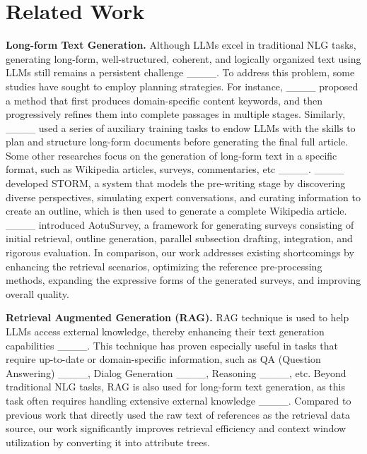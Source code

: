 \section{Related Work}
\textbf{Long-form Text Generation.}
Although LLMs excel in traditional NLG tasks, generating long-form, well-structured, coherent, and logically organized text using LLMs still remains a persistent challenge ____. To address this problem, some studies have sought to employ planning strategies. For instance, ____ proposed a method that first produces domain-specific content keywords, and then progressively refines them into complete passages in multiple stages. Similarly, ____ used a series of auxiliary training tasks to endow LLMs with the skills to plan and structure long-form documents before generating the final full article. Some other researches focus on the generation of long-form text in a specific format, such as Wikipedia articles, surveys, commentaries, etc ____. ____ developed STORM, a system that models the pre-writing stage by discovering diverse perspectives, simulating expert conversations, and curating information to create an outline, which is then used to generate a complete Wikipedia article. ____ introduced AotuSurvey, a framework for generating surveys consisting of initial retrieval, outline generation, parallel subsection drafting, integration, and rigorous evaluation. In comparison, our work addresses existing shortcomings by enhancing the retrieval scenarios, optimizing the reference pre-processing methods, expanding the expressive forms of the generated surveys, and improving overall quality.

\textbf{Retrieval Augmented Generation (RAG).}
RAG technique is used to help LLMs access external knowledge, thereby enhancing their text generation capabilities ____. This technique has proven especially useful in tasks that require up-to-date or domain-specific information, such as QA (Question Answering) ____, Dialog Generation ____, Reasoning ____, etc. Beyond traditional NLG tasks, RAG is also used for long-form text generation, as this task often requires handling extensive external knowledge ____. Compared to previous work that directly used the raw text of references as the retrieval data source, our work significantly improves retrieval efficiency and context window utilization by converting it into attribute trees.